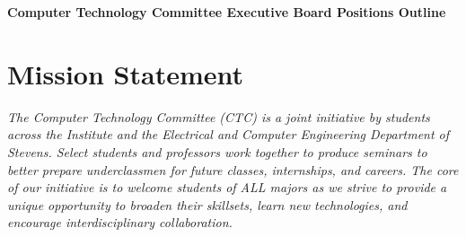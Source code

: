 \documentclass[a4paper,12pt]{article}
\renewcommand{\maketitle}{
\begin{center}
{\bfseries\LARGE Computer Technology Committee Executive Board Positions Outline}
\end{center}
}
\begin{document}
\maketitle

\section{Mission Statement}
\textit{The Computer Technology Committee (CTC) is a joint initiative by students across the Institute and the Electrical and Computer Engineering Department of Stevens. Select students and professors work together to produce seminars to better prepare underclassmen for future classes, internships, and careers. The core of our initiative is to welcome students of ALL majors as we strive to provide a unique opportunity to broaden their skillsets, learn new technologies, and encourage interdisciplinary collaboration.}
\end{document}
